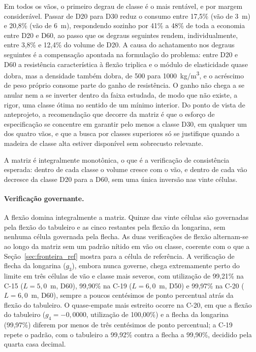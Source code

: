 Em todos os vãos, o primeiro degrau de classe é o mais rentável, e por margem considerável.
Passar de D20 para D30 reduz o consumo entre 17{,}5\% (vão de 3~m) e 20{,}8\% (vão de 6~m), respondendo sozinho por 41\% a 48\% de toda a economia entre D20 e D60, ao passo que os degraus seguintes rendem, individualmente, entre 3{,}8\% e 12{,}4\% do volume de D20.
A causa do achatamento nos degraus seguintes é a compensação apontada na formulação do problema: entre D20 e D60 a resistência característica à flexão triplica e o módulo de elasticidade quase dobra, mas a densidade também dobra, de 500 para 1000~kg/m\textsuperscript{3}, e o acréscimo de peso próprio consome parte do ganho de resistência.
O ganho não chega a se anular nem a se inverter dentro da faixa estudada, de modo que não existe, a rigor, uma classe ótima no sentido de um mínimo interior.
Do ponto de vista de anteprojeto, a recomendação que decorre da matriz é que o esforço de especificação se concentre em garantir pelo menos a classe D30, em qualquer um dos quatro vãos, e que a busca por classes superiores só se justifique quando a madeira de classe alta estiver disponível sem sobrecusto relevante.

A matriz é integralmente monotônica, o que é a verificação de consistência esperada: dentro de cada classe o volume cresce com o vão, e dentro de cada vão decresce da classe D20 para a D60, sem uma única inversão nas vinte células.

\paragraph{Verificação governante.} A flexão domina integralmente a matriz. Quinze das vinte células são governadas pela flexão do tabuleiro e as cinco restantes pela flexão da longarina, sem nenhuma célula governada pela flecha.
As duas verificações de flexão alternam-se ao longo da matriz sem um padrão nítido em vão ou classe, coerente com o que a Seção~\ref{sec:fronteira_ref} mostra para a célula de referência.
A verificação de flecha da longarina ($g_3$), embora nunca governe, chega extremamente perto do limite em três células de vão e classe mais severos, com utilização de 99{,}21\% na C-15 ($L = 5{,}0$~m, D60), 99{,}90\% na C-19 ($L = 6{,}0$~m, D50) e 99{,}97\% na C-20 ($L = 6{,}0$~m, D60), sempre a poucos centésimos de ponto percentual atrás da flexão do tabuleiro.
O quase-empate mais estreito ocorre na C-20, em que a flexão do tabuleiro ($g_4 = -0{,}0000$, utilização de 100{,}00\%) e a flecha da longarina (99{,}97\%) diferem por menos de três centésimos de ponto percentual; a C-19 repete o padrão, com o tabuleiro a 99{,}92\% contra a flecha a 99{,}90\%, decidido pela quarta casa decimal.

